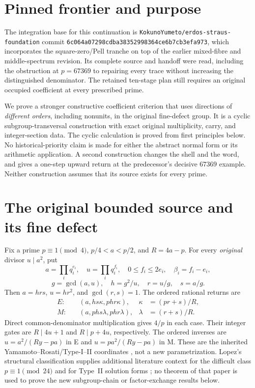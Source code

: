 \section{Pinned frontier and purpose}
The integration base for this continuation is
\texttt{KokunoYumeto/erdos-straus-foundation} commit
\texttt{6c064a07298cdba38352998364ce6b7cb3efa973}, which incorporates the
square-zero/Pell tranche on top of the earlier mixed-fibre and middle-spectrum
revision. Its complete source and handoff were read, including the obstruction
at $p=67369$ to repairing every trace without increasing the distinguished
denominator. The retained ten-stage plan still requires an original occupied
coefficient at every prescribed prime.

We prove a stronger constructive coefficient criterion that uses directions of
\emph{different orders}, including nonunits, in the original fine-defect group.
It is a cyclic subgroup-transversal construction with exact original multiplicity,
carry, and integer-section data. The cyclic calculation is proved from first principles below. No historical-priority
claim is made for either the abstract normal form or its arithmetic application. A second construction changes the shell and the word,
and gives a one-step upward return at the predecessor's decisive $67369$ example.
Neither construction assumes that its source exists for every prime.

\section{The original bounded source and its fine defect}
Fix a prime $p\equiv1\pmod4$, $p/4<a<p/2$, and $R=4a-p$. For every
\emph{original} divisor $u\mid a^2$, put
\[
 a=\prod_iq_i^{e_i},\quad u=\prod_iq_i^{f_i},\quad
 0\le f_i\le2e_i,\quad\beta_i=f_i-e_i,
\]
\[
 g=\gcd(a,u),\quad h=g^2/u,\quad r=u/g,\quad s=a/g.
\]
Then $a=hrs$, $u=hr^2$, and $\gcd(r,s)=1$. The ordered rational returns are
\begin{align}
 E:&\quad(a,hs\kappa,phr\kappa),&\kappa&=(pr+s)/R,\label{eq:E}\\
 M:&\quad(a,phs\lambda,phr\lambda),&\lambda&=(r+s)/R.\label{eq:M}
\end{align}
Direct common-denominator multiplication gives $4/p$ in each case. Their
integer gates are $R\mid4u+1$ and $R\mid p+4u$, respectively. The ordered
inverses are $u=a^2/(Ry-pa)$ in E and $u=pa^2/(Ry-pa)$ in M.
These are the inherited Yamamoto--Rosati/Type-I--II coordinates
\citep[p.~38, Lemma~2, equation~(4)]{Yamamoto}\citep[\S2, Propositions~2.2
and~2.6]{ET}, not a new parametrization.
Lopez's structural classification supplies additional literature context for
the difficult class $p\equiv1\pmod{24}$ and for Type~II solution forms
\citep[Introduction and the Type~A/B definitions]{Lopez}; no theorem of that
paper is used to prove the new subgroup-chain or factor-exchange results below.

